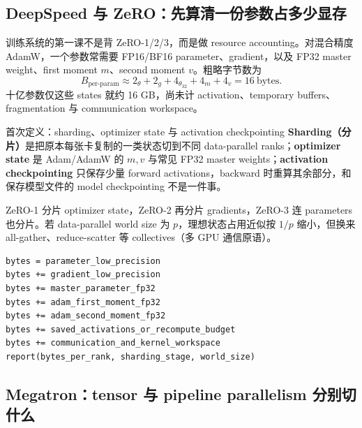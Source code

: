 
\subsection{DeepSpeed 与 ZeRO：先算清一份参数占多少显存}

训练系统的第一课不是背 ZeRO-1/2/3，而是做 resource accounting。对混合精度 AdamW，一个参数常需要 FP16/BF16 parameter、gradient，以及 FP32 master weight、first moment $m$、second moment $v$。粗略字节数为
\[
B_{\text{per-param}}\approx 2_{\theta}+2_g+4_{\theta_{32}}+4_m+4_v=16\ \text{bytes}.
\]
十亿参数仅这些 states 就约 16 GB，尚未计 activation、temporary buffers、fragmentation 与 communication workspace。


\begin{importantbox}{首次定义：sharding、optimizer state 与 activation checkpointing}
\textbf{Sharding（分片）}是把原本每张卡复制的一类状态切到不同 data-parallel ranks；\textbf{optimizer state} 是 Adam/AdamW 的 $m,v$ 与常见 FP32 master weights；\textbf{activation checkpointing} 只保存少量 forward activations，backward 时重算其余部分，和保存模型文件的 model checkpointing 不是一件事。
\end{importantbox}

ZeRO-1 分片 optimizer state，ZeRO-2 再分片 gradients，ZeRO-3 连 parameters 也分片。若 data-parallel world size 为 $p$，理想状态占用近似按 $1/p$ 缩小，但换来 all-gather、reduce-scatter 等 collectives（多 GPU 通信原语）。

\begin{lstlisting}[caption={混合精度训练的显存核算清单}]
bytes = parameter_low_precision
bytes += gradient_low_precision
bytes += master_parameter_fp32
bytes += adam_first_moment_fp32
bytes += adam_second_moment_fp32
bytes += saved_activations_or_recompute_budget
bytes += communication_and_kernel_workspace
report(bytes_per_rank, sharding_stage, world_size)
\end{lstlisting}


\subsection{Megatron：tensor 与 pipeline parallelism 分别切什么}

